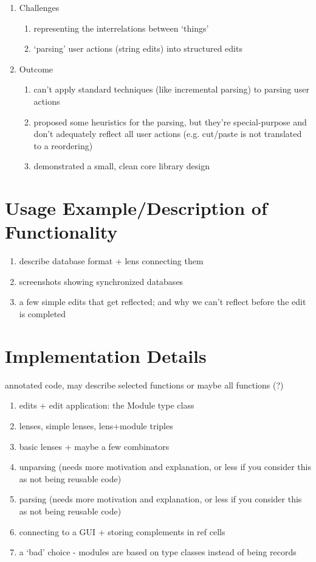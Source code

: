 \begin{enumerate}
    \item Challenges
        \begin{enumerate}
            \item representing the interrelations between `things'
            \item `parsing' user actions (string edits) into structured edits
        \end{enumerate}
    \item Outcome
        \begin{enumerate}
            \item can't apply standard techniques (like incremental parsing) to parsing user actions
            \item proposed some heuristics for the parsing, but they're special-purpose and don't adequately reflect all user actions (e.g. cut/paste is not translated to a reordering)
            \item demonstrated a small, clean core library design
        \end{enumerate}
\end{enumerate}

\section{Usage Example/Description of Functionality}
\label{sec:impl-usage}
\begin{enumerate}
    \item describe database format + lens connecting them
    \item screenshots showing synchronized databases
    \item a few simple edits that get reflected; and why we can't reflect before the edit is completed
\end{enumerate}

\section{Implementation Details}
\label{sec:impl-details}
annotated code, may describe selected functions or maybe all functions (?)
\begin{enumerate}
    \item edits + edit application: the Module type class
    \item lenses, simple lenses, lens+module triples
    \item basic lenses + maybe a few combinators
    \item unparsing (needs more motivation and explanation, or less if you consider this as not being reusable code)
    \item parsing (needs more motivation and explanation, or less if you consider this as not being reusable code)
    \item connecting to a GUI + storing complements in ref cells
    \item a `bad' choice - modules are based on type classes instead of being records
\end{enumerate}

